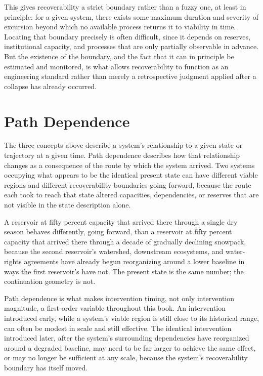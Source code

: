 \documentclass[11pt,oneside]{book}
\begin{document}
This gives recoverability a strict boundary rather than a fuzzy one, at least in principle: for a given system, there exists some maximum duration and severity of excursion beyond which no available process returns it to viability in time. Locating that boundary precisely is often difficult, since it depends on reserves, institutional capacity, and processes that are only partially observable in advance. But the existence of the boundary, and the fact that it can in principle be estimated and monitored, is what allows recoverability to function as an engineering standard rather than merely a retrospective judgment applied after a collapse has already occurred.

\section*{Path Dependence}

The three concepts above describe a system's relationship to a given state or trajectory at a given time. Path dependence describes how that relationship changes as a consequence of the route by which the system arrived. Two systems occupying what appears to be the identical present state can have different viable regions and different recoverability boundaries going forward, because the route each took to reach that state altered capacities, dependencies, or reserves that are not visible in the state description alone.

A reservoir at fifty percent capacity that arrived there through a single dry season behaves differently, going forward, than a reservoir at fifty percent capacity that arrived there through a decade of gradually declining snowpack, because the second reservoir's watershed, downstream ecosystems, and water-rights agreements have already begun reorganizing around a lower baseline in ways the first reservoir's have not. The present state is the same number; the continuation geometry is not.

Path dependence is what makes intervention timing, not only intervention magnitude, a first-order variable throughout this book. An intervention introduced early, while a system's viable region is still close to its historical range, can often be modest in scale and still effective. The identical intervention introduced later, after the system's surrounding dependencies have reorganized around a degraded baseline, may need to be far larger to achieve the same effect, or may no longer be sufficient at any scale, because the system's recoverability boundary has itself moved.
\end{document}
